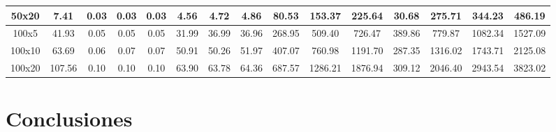 \documentclass[10pt, twoside]{article}
\begin{document}
\begin{table}[H]
{\begin{tabular}{|c|c|c|c|c|c|c|c|c|c|c|c|c|c|c|}
            \hline                                                                                                                                                                  
            50x20     &      7.41       &    0.03      &     0.03     &     0.03     &   4.56   &    4.72   &  4.86    &  80.53 &  153.37 &  225.64 & 30.68  &  275.71 &  344.23 &  486.19 \\
            \hline                                                                                                                                              
            100x5     &      41.93      &    0.05      &     0.05     &     0.05     &   31.99  &    36.99  &  36.96   & 268.95 &  509.40 &  726.47 & 389.86 &  779.87 & 1082.34 & 1527.09 \\
            \hline
            100x10    &      63.69      &    0.06      &     0.07     &     0.07     &   50.91  &    50.26  &  51.97   & 407.07 &  760.98 & 1191.70 & 287.35 & 1316.02 & 1743.71 & 2125.08 \\
            \hline
            100x20    &      107.56     &    0.10      &     0.10     &     0.10     &   63.90  &    63.78  &  64.36   & 687.57 & 1286.21 & 1876.94 & 309.12 & 2046.40 & 2943.54 & 3823.02 \\
            \hline
        \end{tabular}}
        \label{table:3}
    \end{table}

\section{Conclusiones}
\end{document}
